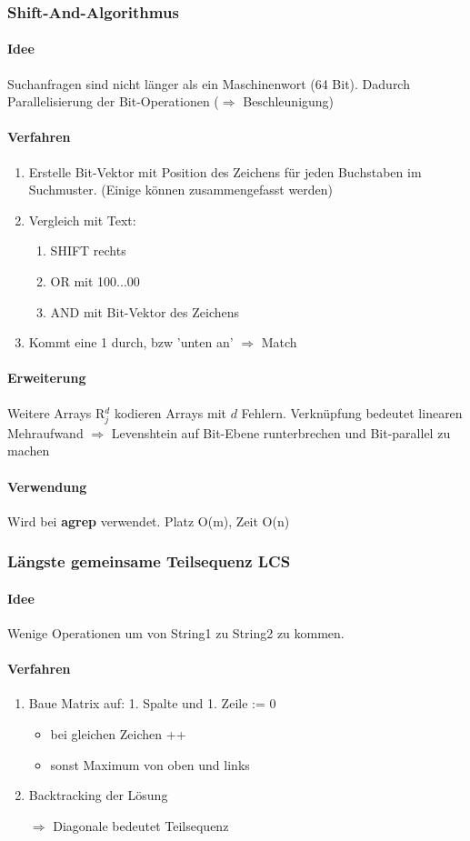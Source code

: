 \documentclass{article}
\begin{document}
\subsubsection{Shift-And-Algorithmus}
\paragraph{Idee} Suchanfragen sind nicht länger als ein Maschinenwort (64 Bit). Dadurch Parallelisierung der Bit-Operationen ($\Rightarrow$ Beschleunigung)

\paragraph{Verfahren}
\begin{enumerate}
\item Erstelle Bit-Vektor mit Position des Zeichens für jeden Buchstaben im Suchmuster. (Einige können zusammengefasst werden)
\item Vergleich mit Text:
\begin{enumerate}
\item SHIFT rechts
\item OR mit 100...00
\item AND mit Bit-Vektor des Zeichens
\end{enumerate}
\item Kommt eine 1 durch, bzw 'unten an' $\Rightarrow$ Match
\end{enumerate}
\paragraph{Erweiterung} Weitere Arrays R$_{j}^{d}$ kodieren Arrays mit $d$ Fehlern. Verknüpfung bedeutet linearen Mehraufwand $\Rightarrow$ Levenshtein auf Bit-Ebene runterbrechen und Bit-parallel zu machen
\paragraph{Verwendung} Wird bei \textbf{agrep} verwendet. Platz O(m), Zeit O(n)

\subsubsection{Längste gemeinsame Teilsequenz LCS}
\paragraph{Idee} Wenige Operationen um von String1 zu String2 zu kommen.
\paragraph{Verfahren}
\begin{enumerate}
\item Baue Matrix auf: 1. Spalte und 1. Zeile := 0
\begin{itemize}
\item bei gleichen Zeichen ++
\item sonst Maximum von oben und links
\end{itemize}
\item Backtracking der Lösung
\item[$\Rightarrow$] Diagonale bedeutet Teilsequenz
\end{enumerate}
\end{document}
